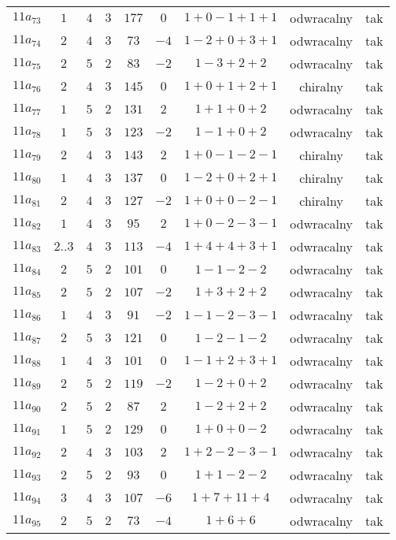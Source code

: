 \begin{longtable}{ccccccccc}
$11a_{73}$ & $1$ & $4$ & $3$ & $177$ & $0$ & $1+0-1+1+1$ & odwracalny & tak \\
$11a_{74}$ & $2$ & $4$ & $3$ & $73$ & $-4$ & $1-2+0+3+1$ & odwracalny & tak \\
$11a_{75}$ & $2$ & $5$ & $2$ & $83$ & $-2$ & $1-3+2+2$ & odwracalny & tak \\
$11a_{76}$ & $2$ & $4$ & $3$ & $145$ & $0$ & $1+0+1+2+1$ & chiralny & tak \\
$11a_{77}$ & $1$ & $5$ & $2$ & $131$ & $2$ & $1+1+0+2$ & odwracalny & tak \\
$11a_{78}$ & $1$ & $5$ & $3$ & $123$ & $-2$ & $1-1+0+2$ & odwracalny & tak \\
$11a_{79}$ & $2$ & $4$ & $3$ & $143$ & $2$ & $1+0-1-2-1$ & chiralny & tak \\
$11a_{80}$ & $1$ & $4$ & $3$ & $137$ & $0$ & $1-2+0+2+1$ & chiralny & tak \\
$11a_{81}$ & $2$ & $4$ & $3$ & $127$ & $-2$ & $1+0+0-2-1$ & chiralny & tak \\
$11a_{82}$ & $1$ & $4$ & $3$ & $95$ & $2$ & $1+0-2-3-1$ & odwracalny & tak \\
$11a_{83}$ & $2..3$ & $4$ & $3$ & $113$ & $-4$ & $1+4+4+3+1$ & odwracalny & tak \\
$11a_{84}$ & $2$ & $5$ & $2$ & $101$ & $0$ & $1-1-2-2$ & odwracalny & tak \\
$11a_{85}$ & $2$ & $5$ & $2$ & $107$ & $-2$ & $1+3+2+2$ & odwracalny & tak \\
$11a_{86}$ & $1$ & $4$ & $3$ & $91$ & $-2$ & $1-1-2-3-1$ & odwracalny & tak \\
$11a_{87}$ & $2$ & $5$ & $3$ & $121$ & $0$ & $1-2-1-2$ & odwracalny & tak \\
$11a_{88}$ & $1$ & $4$ & $3$ & $101$ & $0$ & $1-1+2+3+1$ & odwracalny & tak \\
$11a_{89}$ & $2$ & $5$ & $2$ & $119$ & $-2$ & $1-2+0+2$ & odwracalny & tak \\
$11a_{90}$ & $2$ & $5$ & $2$ & $87$ & $2$ & $1-2+2+2$ & odwracalny & tak \\
$11a_{91}$ & $1$ & $5$ & $2$ & $129$ & $0$ & $1+0+0-2$ & odwracalny & tak \\
$11a_{92}$ & $2$ & $4$ & $3$ & $103$ & $2$ & $1+2-2-3-1$ & odwracalny & tak \\
$11a_{93}$ & $2$ & $5$ & $2$ & $93$ & $0$ & $1+1-2-2$ & odwracalny & tak \\
$11a_{94}$ & $3$ & $4$ & $3$ & $107$ & $-6$ & $1+7+11+4$ & odwracalny & tak \\
$11a_{95}$ & $2$ & $5$ & $2$ & $73$ & $-4$ & $1+6+6$ & odwracalny & tak \\

\end{longtable}
